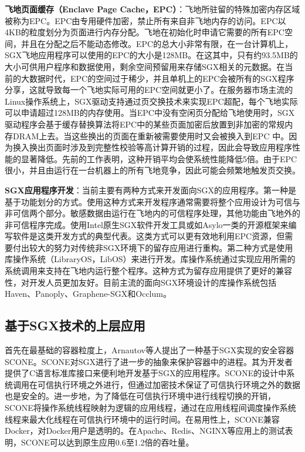 \textbf{飞地页面缓存（Enclave Page Cache，EPC）}：飞地所驻留的特殊加密内存区域被称为EPC。EPC由专用硬件加密，禁止所有来自非飞地内存的访问。EPC以4KB的粒度划分为页面进行内存分配。飞地在初始化时申请它需要的所有EPC空间，并且在分配之后不能动态修改。EPC的总大小非常有限，在一台计算机上，SGX飞地应用程序可以使用的EPC的大小是128MB。在这其中，只有约93.5MB的大小可供用户程序和数据使用，剩余空间预留用来存储SGX相关的元数据。在当前的大数据时代，EPC的空间过于稀少，并且单机上的EPC会被所有的SGX程序分享，这就导致每一个飞地实际可用的EPC空间就更小了。在服务器市场主流的Linux操作系统上，SGX驱动支持通过页交换技术来实现EPC超配，每个飞地实际可以申请超过128MB的内存使用。当EPC中没有空闲页分配给飞地使用时，SGX驱动程序会基于缓存替换算法将EPC中的某些页面加密后放置到非加密的常规内存DRAM上去。当这些换出的页面在重新被需要使用时又会被换入到EPC 中。因为换入换出页面时涉及到完整性校验等高计算开销的过程，因此会导致应用程序性能的显著降低。先前的工作表明，这种开销平均会使系统性能降低5倍。由于EPC很小，并且由运行在一台机器上的所有飞地竞争，因此可能会频繁地触发页交换。

\textbf{SGX应用程序开发}：当前主要有两种方式来开发面向SGX的应用程序。第一种是基于功能划分的方式。使用这种方式来开发程序通常需要将整个应用设计为可信与非可信两个部分。敏感数据由运行在飞地内的可信程序处理，其他功能由飞地外的非可信程序完成。使用Intel原生SGX软件开发工具或如Asylo一类的开源框架来编写软件是这类开发方式的典型代表。这类方式可以更有效地利用EPC资源，但需要付出较大的努力对传统非SGX环境下的留存应用进行重构。第二种方式是使用库操作系统（LibraryOS，LibOS）来进行开发。库操作系统通过实现应用所需的系统调用来支持在飞地内运行整个程序。这种方式为留存应用提供了更好的兼容性，对开发人员更加友好。目前主流的面向SGX环境设计的库操作系统包括Haven、Panoply、Graphene-SGX和Occlum。

\subsection{基于SGX技术的上层应用}

首先在最基础的容器粒度上，Arnautov等人提出了一种基于SGX实现的安全容器SCONE。SCONE对SGX进行了进一步的抽象来保护容器中的进程。其为开发者提供了C语言标准库接口来便利地开发基于SGX的应用程序。SCONE的设计中系统调用在可信执行环境之外进行，但通过加密技术保证了可信执行环境之外的数据也是安全的。进一步地，为了降低在可信执行环境中进行线程切换的开销，SCONE将操作系统线程映射为逻辑的应用线程，通过在应用线程间调度操作系统线程来最大化线程在可信执行环境中的运行时间。在易用性上，SCONE兼容Docker，对Docker用户是透明的。在Apache、Redis、NGINX等应用上的测试表明，SCONE可以达到原生应用0.6至1.2倍的吞吐量。

